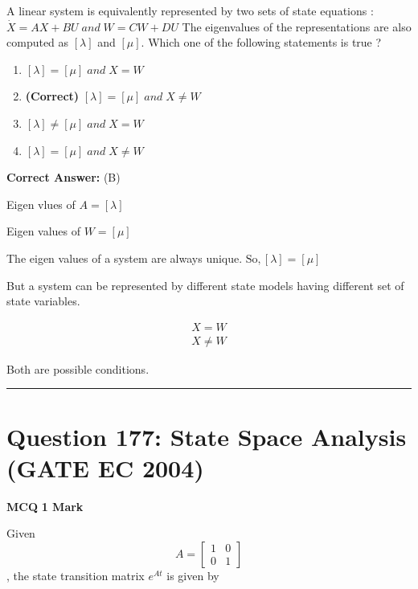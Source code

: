 \documentclass[11pt,a4paper]{article}
\begin{document}
\noindent A linear system is equivalently represented by two sets of state equations : 
$\dot{X}=AX+BU \; and \;  W=CW+DU$ 
The eigenvalues of the representations are also computed as $[\lambda]$ and $[\mu]$. Which one of the following statements is true ?


\begin{enumerate}[label=(\Alph*)]
    \item $[\lambda ]=[\mu ]  \; and \;  X=W$
    \item \textbf{(Correct)} $[\lambda ]=[\mu ]  \; and \;  X\neq W$
    \item $[\lambda ]\neq [\mu ]  \; and \;  X= W$
    \item $[\lambda ]= [\mu ]  \; and \;  X\neq W$
\end{enumerate}

\noindent \textbf{Correct Answer:} (B)

\begin{tcolorbox}[solbox, title=Detailed Solution -- Question 176]
Eigen vlues of $A=[\lambda]$

Eigen values of  $W=[\mu]$

The eigen values of a system are always unique. 
$\mathrm{So},[\lambda]=[\mu]$

But a system can be represented by different state
models having different set of state variables.

\[
\begin{array}{l}
X=W \\
X \neq W
\end{array}
\]

Both are possible conditions.
\end{tcolorbox}

\vspace{1.5em}
\hrule
\vspace{1.5em}

\section*{Question 177: State Space Analysis (GATE EC 2004)}
\noindent \textbf{\color{primary}MCQ} \hfill \textbf{\color{secondary}1 Mark}


\noindent Given 
\[
A=\begin{bmatrix} 1 & 0\\ 0&1 \end{bmatrix}
\]
, the state transition matrix $e^{At}$ is given by
\end{document}
